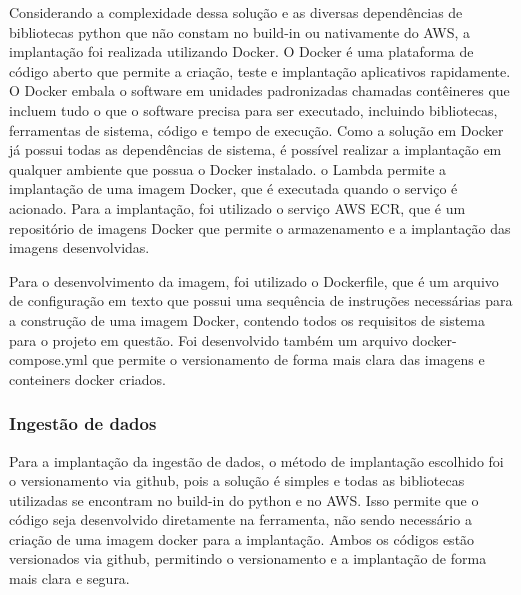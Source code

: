 Considerando a complexidade dessa solução e as diversas dependências de bibliotecas python que não constam no build-in ou nativamente do AWS, a implantação foi realizada utilizando Docker. O Docker é uma plataforma de código aberto que permite a criação, teste e implantação aplicativos rapidamente. O Docker embala o software em unidades padronizadas chamadas contêineres que incluem tudo o que o software precisa para ser executado, incluindo bibliotecas, ferramentas de sistema, código e tempo de execução. Como a solução em Docker já possui todas as dependências de sistema, é possível realizar a implantação em qualquer ambiente que possua o Docker instalado. o Lambda permite a implantação de uma imagem Docker, que é executada quando o serviço é acionado. Para a implantação, foi utilizado o serviço AWS ECR, que é um repositório de imagens Docker que permite o armazenamento e a implantação das imagens desenvolvidas.

Para o desenvolvimento da imagem, foi utilizado o Dockerfile, que é um arquivo de configuração em texto que possui uma sequência de instruções necessárias para a construção de uma imagem Docker, contendo todos os requisitos de sistema para o projeto em questão. Foi desenvolvido também um arquivo docker-compose.yml que permite o versionamento de forma mais clara das imagens e conteiners docker criados.

\subsubsection{Ingestão de dados}

Para a implantação da ingestão de dados, o método de implantação escolhido foi o versionamento via github, pois a solução é simples e todas as bibliotecas utilizadas se encontram no build-in do python e no AWS. Isso permite que o código seja desenvolvido diretamente na ferramenta, não sendo necessário a criação de uma imagem docker para a implantação. Ambos os códigos estão versionados via github, permitindo o versionamento e a implantação de forma mais clara e segura.